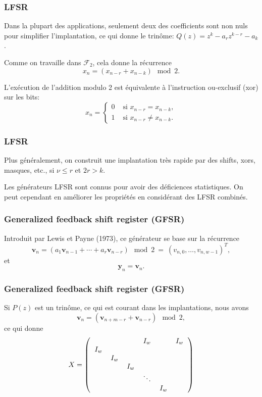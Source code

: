 \documentclass[t,usepdftitle=false]{beamer}
\def\bv{\boldsymbol{v}}
\def\by{\boldsymbol{y}}
\begin{document}
\begin{frame}
\frametitle{LFSR}

Dans la plupart des applications, seulement deux des coefficients sont
non nuls pour simplifier l'implantation, ce qui donne le trinôme:
${Q(z)} = z^k - a_r z^{k-r} - a_k$.

\mbox{}

Comme on travaille dans $\mathcal{F}_2$, cela donne la récurrence
\[
x_n = (x_{n-r}+x_{n-k}) \mod 2.
\]

\mbox{}

L'exécution de l'addition modulo 2 est équivalente à l'instruction
ou-exclusif (xor) sur les bits:
\[
x_n =
\begin{cases}
0 & \mbox{ si } x_{n-r} = x_{n-k},\\
1 & \mbox{ si } x_{n-r} \ne x_{n-k}.
\end{cases}
\]

\end{frame}

\begin{frame}
\frametitle{LFSR}

Plus généralement, on construit une implantation très rapide par des
shifts, xors, masques, etc., si $\nu \le r$ et $2r > k$.

\mbox{}

Les générateurs LFSR sont connus pour avoir des déficiences
statistiques.
On peut cependant en améliorer les propriétés en considérant des LFSR
combinés.

\end{frame}

\begin{frame}
\frametitle{Generalized feedback shift register (GFSR)}

Introduit par Lewis et Payne (1973), ce générateur se base sur la
récurrence
\[
 {\bv_n} = (a_1 \bv_{n-1} + \cdots + a_r \bv_{n-r}) \mod 2 
       ~=~ (v_{n,0},\dots,v_{n,w-1})^T,
\]
et
\[
 \by_n = \bv_{n}.
\]

\end{frame}

\begin{frame}
\frametitle{Generalized feedback shift register (GFSR)}

Si $P(z)$ est un trinôme, ce qui est courant dans les implantations, nous avons
\[
 {\bv_n} = (\bv_{n+m-r} + \bv_{n-r}) \mod 2,
\]
ce qui donne
\[
   X =
\left(
\begin{tabular}{cccccc}
   &        &       &  $I_w$ &     & $I_w$ \\
$I_w$&      &       &        &     &    \\
   &  $I_w$ &       &        &     &    \\
   &        & $I_w$ &        &     &    \\
   &        &       &$\ddots$&     &    \\
   &        &       &        &$I_w$&
\end{tabular}
\right)
\]

\end{frame}
\end{document}
